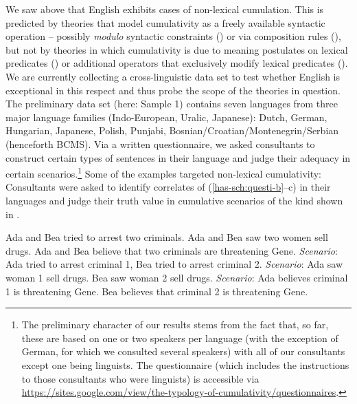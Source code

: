 \documentclass[output=paper]{langscibook}
\begin{document}
We saw above that English exhibits cases of non-lexical cumulation. This is predicted by theories that model cumulativity as a freely  available
 syntactic operation -- possibly \textit{modulo} syntactic constraints () or via composition rules (), but not by theories in which cumulativity is due to meaning postulates on lexical predicates () or additional operators that exclusively modify lexical predicates (). We are currently collecting a cross-linguistic data set to test whether English is exceptional in this respect and thus probe the scope of the theories in question. The preliminary data set (here: Sample 1) contains seven languages from three major language families (Indo-European, Uralic, Japanese): 
Dutch, German, Hungarian, Japanese, Polish, Punjabi, Bosnian/Croatian/Montenegrin/\-Serbian (henceforth BCMS). 
Via a written questionnaire, we asked consultants to construct certain types of sentences in their language and judge their adequacy in certain scenarios.{\footnote{The preliminary character of our results stems from the fact that, so far, these are based on one or two speakers per  language (with the exception of German, for which we consulted several speakers) with all of our consultants except one being linguists. The questionnaire (which includes the instructions to those consultants who were linguists) is accessible via \url{https://sites.google.com/view/the-typology-of-cumulativity/questionnaires}.}} Some of the examples targeted non-lexical cumulativity: Consultants were asked to identify correlates of (\ref{has-sch:questi-b}--c) in their languages and judge their truth value in cumulative scenarios of the kind shown in .

\ea\label{has-sch:questi}
\ea \label{has-sch:questi-b}  Ada and Bea tried to arrest two criminals.
\ex \label{has-sch:questi-c}  Ada and Bea saw two women sell drugs.
\ex \label{has-sch:questi-d}  Ada and Bea believe that two criminals are threatening Gene. 
\z\ex\label{has-sch:sceni}
\ea \textit{Scenario}: Ada tried to arrest criminal 1, Bea tried to arrest criminal 2.\label{has-sch:sceni-b} 
\ex \textit{Scenario}: Ada saw woman 1 sell drugs. Bea saw woman 2 sell drugs. \label{has-sch:sceni-c} 
\ex  \textit{Scenario}: Ada believes criminal 1 is threatening Gene. Bea believes that criminal 2 is threatening Gene. \label{has-sch:sceni-d} 
\z\z
\end{document}
